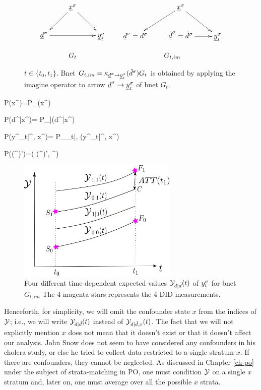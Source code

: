 \begin{figure}[h!]
$$
\begin{array}{ccccc}
\xymatrix{
&\rvx^\s\ar[dl]\ar[dr]
\\
\rvd^\s\ar[rr]&&\rvy^\s_t
}
&&
\xymatrix{
&\rvx^\s\ar[dl]\ar[dr]
\\
\rvd^\s=d^\s&\rvtd^\s=\td^\s\ar[r]&\rvy^\s_t
}
\\
\\
G_t&&G_{t, im}
\end{array}
$$
\caption{$t\in \{t_0, t_1\}$.
Bnet 
$G_{t, im}= \kappa_{{\underline{d}}^\sigma\rightarrow{\underline{y}}^\sigma_t}
({\tilde{d}}^\sigma)G_t$
is obtained by applying 
the imagine operator to arrow 
${\underline{d}}^\sigma\rightarrow{\underline{y}}^\sigma_t$
of bnet $G_t$.}
\label{fig-did-G_t-im}
\end{figure}

\beq\color{blue}
P(x^\s)=P_\rvx(x^\s)
\eeq

\beq\color{blue}
P(d^\s|x^\s)= 
P_{\rvd|\rvx}(d^\s|x^\s)
\eeq
 
\beq\color{blue}
P(y^\s_t|\td^\s, x^\s)=
P_{\rvy_t|\rvd, \rvx}(y^\s_t|\td^\s, x^\s)
\eeq

\beq\color{blue}
P((\td^\s)')=\delta(
(\td^\s)', \td^\s)
\eeq

\begin{figure}[h!]
\centering
\includegraphics[width=3in]
{did/dif-dif-bc.png}
\caption{
Four different time-dependent
expected 
values ${\cal Y}_{d|{\tilde{d}}}(t)$ of $y^\sigma_t$
for bnet $G_{t, im}$
The 4 magenta  stars
represents the 4 DID measurements.
} 
\label{fig-dif-dif-bc}
\end{figure}

Henceforth, 
for simplicity, we will
omit the confounder state $x$
from the indices of ${\cal Y}$; i.e., we will write
${\cal Y}_{d|{\tilde{d}}}(t)$
instead of ${\cal Y}_{d|{\tilde{d}}, x}(t)$.
The fact that we will
not explicitly
mention $x$ does not
mean that it doesn't exist
or that it doesn't affect our analysis.
John Snow
does not seem to have considered any confounders
in his cholera study,
or else he tried to collect 
data restricted to a single stratum $x$.
If there are confounders,
they cannot be neglected.
As discussed in Chapter \ref{ch-po}
under the subject of strata-matching in PO,
one must condition ${\cal Y}$
on a single $x$ stratum
and, later on,  one must average
over all the possible $x$ strata.


